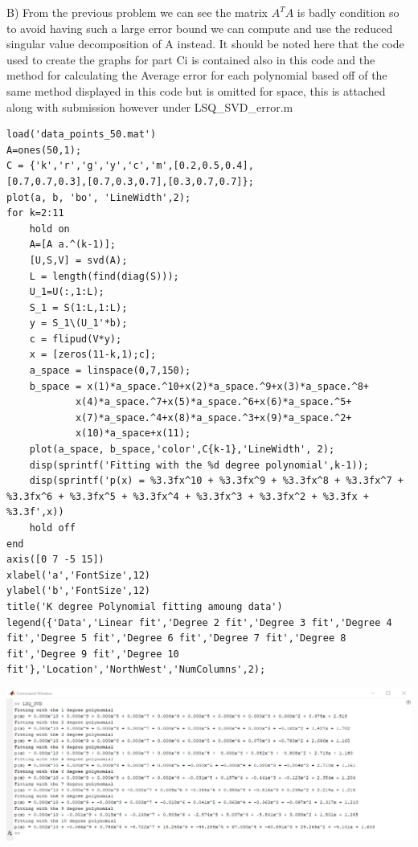 \documentclass{report}
\begin{document}
\clearpage
\noindent B)
\newline
\setlength{\parindent}{25pt}
\indent From the previous problem we can see the matrix $A^TA$ is badly condition so to avoid having such a large error bound we can compute and use the reduced singular value decomposition of A instead. It should be noted here that the code used to create the graphs for part Ci is contained also in this code and the method for calculating the Average error for each polynomial based off of the same method displayed in this code but is omitted for space, this is attached along with submission however under LSQ\_SVD\_error.m

\begin{tcolorbox}
\begin{lstlisting}
load('data_points_50.mat')
A=ones(50,1);
C = {'k','r','g','y','c','m',[0.2,0.5,0.4],
[0.7,0.7,0.3],[0.7,0.3,0.7],[0.3,0.7,0.7]};
plot(a, b, 'bo', 'LineWidth',2);
for k=2:11
    hold on
    A=[A a.^(k-1)];
    [U,S,V] = svd(A);
    L = length(find(diag(S)));
    U_1=U(:,1:L);
    S_1 = S(1:L,1:L);
    y = S_1\(U_1'*b);
    c = flipud(V*y);
    x = [zeros(11-k,1);c];
    a_space = linspace(0,7,150);
    b_space = x(1)*a_space.^10+x(2)*a_space.^9+x(3)*a_space.^8+
            x(4)*a_space.^7+x(5)*a_space.^6+x(6)*a_space.^5+
            x(7)*a_space.^4+x(8)*a_space.^3+x(9)*a_space.^2+
            x(10)*a_space+x(11);
    plot(a_space, b_space,'color',C{k-1},'LineWidth', 2);
    disp(sprintf('Fitting with the %d degree polynomial',k-1));
    disp(sprintf('p(x) = %3.3fx^10 + %3.3fx^9 + %3.3fx^8 + %3.3fx^7 + %3.3fx^6 + %3.3fx^5 + %3.3fx^4 + %3.3fx^3 + %3.3fx^2 + %3.3fx + %3.3f',x))
    hold off
end
axis([0 7 -5 15])
xlabel('a','FontSize',12)
ylabel('b','FontSize',12)
title('K degree Polynomial fitting amoung data')
legend({'Data','Linear fit','Degree 2 fit','Degree 3 fit','Degree 4 fit','Degree 5 fit','Degree 6 fit','Degree 7 fit','Degree 8 fit','Degree 9 fit','Degree 10 fit'},'Location','NorthWest','NumColumns',2);
\end{lstlisting}
\begin{center}
\includegraphics[width=\textwidth] {LSQ_SVD_Output.png}
\end{center}
\end{tcolorbox}
\end{document}

